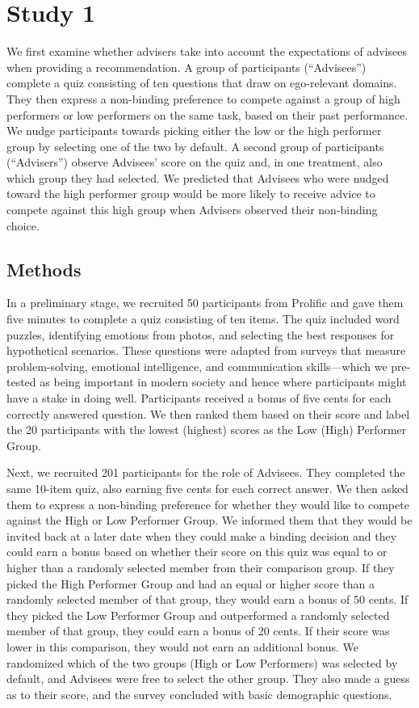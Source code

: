 \documentclass[
  man,
  floatsintext,
  longtable,
  nolmodern,
  notxfonts,
  notimes,
  colorlinks=true,linkcolor=blue,citecolor=blue,urlcolor=blue]{apa7}
\begin{document}
\section{Study 1}\label{study-1}

We first examine whether advisers take into account the expectations of
advisees when providing a recommendation. A group of participants
(``Advisees'') complete a quiz consisting of ten questions that draw on
ego-relevant domains. They then express a non-binding preference to
compete against a group of high performers or low performers on the same
task, based on their past performance. We nudge participants towards
picking either the low or the high performer group by selecting one of
the two by default. A second group of participants (``Advisers'')
observe Advisees' score on the quiz and, in one treatment, also which
group they had selected. We predicted that Advisees who were nudged
toward the high performer group would be more likely to receive advice
to compete against this high group when Advisers observed their
non-binding choice.

\subsection{Methods}\label{methods}

In a preliminary stage, we recruited 50 participants from Prolific and
gave them five minutes to complete a quiz consisting of ten items. The
quiz included word puzzles, identifying emotions from photos, and
selecting the best responses for hypothetical scenarios. These questions
were adapted from surveys that measure problem-solving, emotional
intelligence, and communication skills---which we pre-tested as being
important in modern society and hence where participants might have a
stake in doing well. Participants received a bonus of five cents for
each correctly answered question. We then ranked them based on their
score and label the 20 participants with the lowest (highest) scores as
the Low (High) Performer Group.

Next, we recruited 201 participants for the role of Advisees. They
completed the same 10-item quiz, also earning five cents for each
correct answer. We then asked them to express a non-binding preference
for whether they would like to compete against the High or Low Performer
Group. We informed them that they would be invited back at a later date
when they could make a binding decision and they could earn a bonus
based on whether their score on this quiz was equal to or higher than a
randomly selected member from their comparison group. If they picked the
High Performer Group and had an equal or higher score than a randomly
selected member of that group, they would earn a bonus of 50 cents. If
they picked the Low Performer Group and outperformed a randomly selected
member of that group, they could earn a bonus of 20 cents. If their
score was lower in this comparison, they would not earn an additional
bonus. We randomized which of the two groups (High or Low Performers)
was selected by default, and Advisees were free to select the other
group. They also made a guess as to their score, and the survey
concluded with basic demographic questions.
\end{document}
